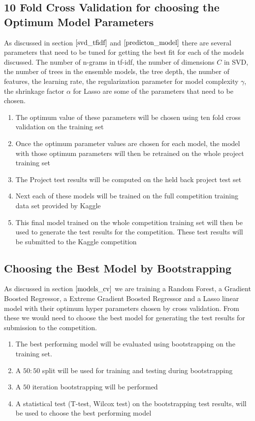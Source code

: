 \documentclass[twoside,12pt]{article}
\begin{document}
\subsection{10 Fold Cross Validation for choosing the Optimum Model Parameters}
\label{models_cv}
As discussed in section $\eqref{svd_tfidf}$ and $\eqref{predicton_model}$ there are several parameters that need to be tuned for getting the best fit for each of the models discussed. The number of n-grams in tf-idf, the number of dimensions $C$ in SVD, the number of trees in the ensemble models, the tree depth, the number of features, the learning rate, the regularization parameter for model complexity $\gamma$, the shrinkage factor $\alpha$ for Lasso are some of the parameters that need to be chosen.
\begin{enumerate}
	\item
	The optimum value of these parameters will be chosen using ten fold cross validation on the training set
	\item
	Once the optimum parameter values are chosen for each model, the model with those optimum parameters will then be retrained on the whole project training set
	\item
	The Project test results will be computed on the held back project test set
	\item
	Next each of these models will be trained on the full competition training data set provided by Kaggle
	\item
	This final model trained on the whole competition training set will then be used to generate the test results for the competition. These test results will be submitted to the Kaggle competition
\end{enumerate}


\subsection{Choosing the Best Model by Bootstrapping}
\label{models_bs}
As discussed in section $\eqref{models_cv}$ we are training a Random Forest, a Gradient Boosted  Regressor, a Extreme Gradient Boosted Regressor and a Lasso linear model with their optimum hyper parameters chosen by cross validation. From these we would need to choose the best model for generating the test results for submission to the competition. 
\begin{enumerate}
		\item
		The best performing model will be evaluated using bootstrapping on the training set. 
		\item
		A $50:50$ split will be used for training and testing during bootstrapping
		\item
		A $50$ iteration bootstrapping will be performed
		\item
		A statistical test (T-test, Wilcox test) on the bootstrapping test results, will be used to choose the best performing model
\end{enumerate}
\end{document}
